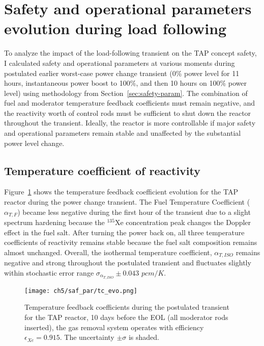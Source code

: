 
\section{Safety and operational parameters evolution during load 
following}\label{ch5:saf_param}
To analyze the impact of the load-following transient on the \gls{TAP} concept 
safety, I calculated safety and operational parameters at various moments 
during postulated earlier worst-case power change transient (0\% power level 
for 11 hours, instantaneous power boost to 100\%, and then 10 hours on 100\% 
power level) using methodology from Section~\ref{sec:safety-param}. The 
combination of fuel and moderator temperature feedback coefficients must 
remain negative, and the reactivity worth of control rods must be sufficient 
to shut down the reactor throughout the transient. Ideally, the reactor is 
more controllable if major safety and operational parameters remain stable and 
unaffected by the substantial power level change.

\subsection{Temperature coefficient of reactivity}
Figure~\ref{fig:lf-tap-tc-evo} shows the temperature feedback coefficient 
evolution for the \gls{TAP} reactor during the power change transient. The 
Fuel Temperature Coefficient ($\alpha_{T,F}$) became less negative during the 
first hour of the transient due to a slight spectrum hardening because the  
$^{135}$Xe concentration peak changes the Doppler effect in the fuel salt. 
After turning the power back on, all three temperature coefficients of 
reactivity remains stable because the fuel salt composition remains almost 
unchanged. Overall, the isothermal temperature coefficient, $\alpha_{T,ISO}$ 
remains negative and strong throughout the postulated transient and 
fluctuates slightly within stochastic error range 
$\sigma_{\alpha_{T,ISO}}\pm0.043$ $pcm/K$. 
\begin{figure}[htp!] %
	\centering
	\texttt{[image: ch5/saf\_par/tc\_evo.png]}
	\caption{Temperature feedback coefficients during the postulated 
		transient for the \gls{TAP} reactor, 10 days before the \gls{EOL} (all 
		moderator rods inserted), the gas removal system operates with 
		efficiency $\epsilon_{Xe}=0.915$. The uncertainty $\pm\sigma$ is 
		shaded.}
		\label{fig:lf-tap-tc-evo}
\end{figure}

